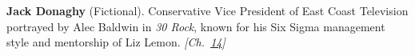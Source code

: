 \textbf{Jack Donaghy} (Fictional). Conservative Vice President of East Coast Television portrayed by Alec Baldwin in \emph{30 Rock}, known for his Six Sigma management style and mentorship of Liz Lemon. \emph{[Ch.~\hyperref[ch:compacttwinparadox]{14}]}

